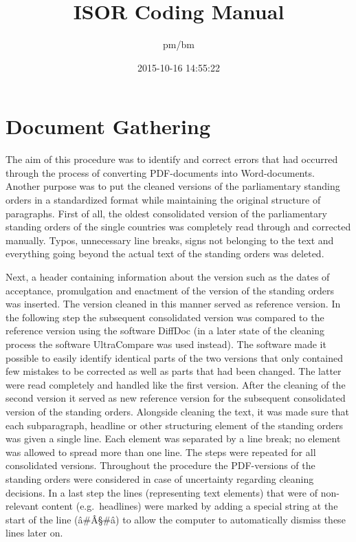 \documentclass[]{article}
\title{ISOR Coding Manual}
\author{pm/bm}
\date{2015-10-16 14:55:22}
\begin{document}
\maketitle

\section{Document Gathering}\label{document-gathering}

The aim of this procedure was to identify and correct errors that had
occurred through the process of converting PDF-documents into
Word-documents. Another purpose was to put the cleaned versions of the
parliamentary standing orders in a standardized format while maintaining
the original structure of paragraphs. First of all, the oldest
consolidated version of the parliamentary standing orders of the single
countries was completely read through and corrected manually. Typos,
unnecessary line breaks, signs not belonging to the text and everything
going beyond the actual text of the standing orders was deleted.

Next, a header containing information about the version such as the
dates of acceptance, promulgation and enactment of the version of the
standing orders was inserted. The version cleaned in this manner served
as reference version. In the following step the subsequent consolidated
version was compared to the reference version using the software DiffDoc
(in a later state of the cleaning process the software UltraCompare was
used instead). The software made it possible to easily identify
identical parts of the two versions that only contained few mistakes to
be corrected as well as parts that had been changed. The latter were
read completely and handled like the first version. After the cleaning
of the second version it served as new reference version for the
subsequent consolidated version of the standing orders. Alongside
cleaning the text, it was made sure that each subparagraph, headline or
other structuring element of the standing orders was given a single
line. Each element was separated by a line break; no element was allowed
to spread more than one line. The steps were repeated for all
consolidated versions. Throughout the procedure the PDF-versions of the
standing orders were considered in case of uncertainty regarding
cleaning decisions. In a last step the lines (representing text
elements) that were of non-relevant content (e.g.~headlines) were marked
by adding a special string at the start of the line (â\#Â§\#â) to allow
the computer to automatically dismiss these lines later on.
\end{document}
